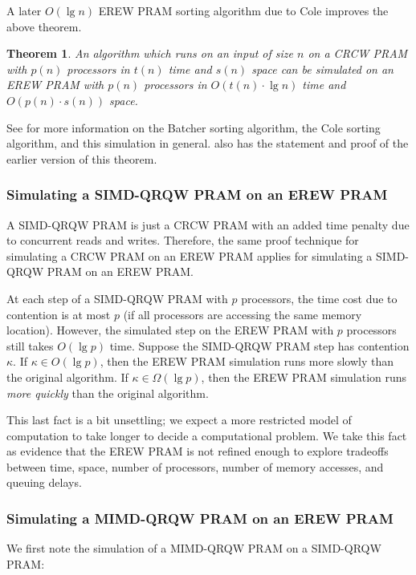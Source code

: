 \documentclass{article}
\newtheorem{theorem}{Theorem}
\begin{document}
A later $O(\lg n)$ EREW PRAM sorting algorithm due to Cole improves the above theorem.

\begin{theorem}
  An algorithm which runs on an input of size $n$ on a CRCW PRAM with $p(n)$ processors in $t(n)$ time and $s(n)$ space can be simulated on an EREW PRAM with $p(n)$ processors in $O(t(n)\cdot \lg n)$ time and $O(p(n) \cdot s(n))$ space.
\end{theorem}

See \cite{smith93} for more information on the Batcher sorting algorithm, the Cole sorting algorithm, and this simulation in general.
\cite{savage98} also has the statement and proof of the earlier version of this theorem.

\subsubsection{Simulating a SIMD-QRQW PRAM on an EREW PRAM}\label{sec:simdqrqwerew}

A SIMD-QRQW PRAM is just a CRCW PRAM with an added time penalty due to concurrent reads and writes.
Therefore, the same proof technique for simulating a CRCW PRAM on an EREW PRAM applies for simulating a SIMD-QRQW PRAM on an EREW PRAM.

At each step of a SIMD-QRQW PRAM with $p$ processors, the time cost due to contention is at most $p$ (if all processors are accessing the same memory location).
However, the simulated step on the EREW PRAM with $p$ processors still takes $O(\lg p)$ time.
Suppose the SIMD-QRQW PRAM step has contention $\kappa$.
If $\kappa\in O(\lg p)$, then the EREW PRAM simulation runs more slowly than the original algorithm.
If $\kappa\in\Omega(\lg p)$, then the EREW PRAM simulation runs \emph{more quickly} than the original algorithm.

This last fact is a bit unsettling; we expect a more restricted model of computation to take longer to decide a computational problem.
We take this fact as evidence that the EREW PRAM is not refined enough to explore tradeoffs between time, space, number of processors, number of memory accesses, and queuing delays.

\subsubsection{Simulating a MIMD-QRQW PRAM on an EREW PRAM}

We first note the simulation of a MIMD-QRQW PRAM on a SIMD-QRQW PRAM:
\end{document}
